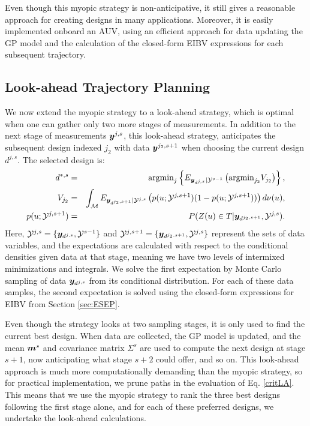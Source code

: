 \documentclass[aoas]{imsart}
\begin{document}
Even though this myopic strategy is non-anticipative, it still gives a
reasonable approach for creating designs in many
applications. Moreover, it is easily implemented onboard an AUV,
using an efficient approach for data updating the GP model and the
calculation of the closed-form EIBV expressions for each
subsequent trajectory.


\subsection{Look-ahead Trajectory Planning}
\label{sec:LA}

We now extend the myopic strategy to a look-ahead strategy, which is
optimal when one can gather only two more stages of measurements. In
addition to the next stage of measurements ${\boldsymbol y}^{j,s}$, this
look-ahead strategy, anticipates the subsequent design indexed $j_2$ with
data ${\boldsymbol y}^{j_2,s+1}$ when choosing the current design $d^{j,s}$.  The
selected design is:
\begin{eqnarray}\label{critLA}
    d^{*,s} &=& \mbox{argmin}_{j} \left\{ E_{\by_{d^{j,s}}|\mathcal{Y}^{s-1}} \left( \mbox{argmin}_{j_2}  V_{j_2} \right) \right\}, \\
V_{j_2} & = & \int_{\mathcal{M}} E_{\by_{d^{j_2,s+1}}|\mathcal{Y}^{j,s}} \left( p(\x;\mathcal{Y}^{j,s+1}) ( 1-p(\x;\mathcal{Y}^{j,s+1}) ) \right) d\mes(u), \nonumber \\
    p(\x;\mathcal{Y}^{j,s+1}) &=& P(Z(\x) \in T |\by_{d^{j_2,s+1}},\mathcal{Y}^{j,s}). \nonumber
\end{eqnarray}
Here, $\mathcal{Y}^{j,s}=\{{\boldsymbol y}_{d^{j,s}},\mathcal{Y}^{s-1}\}$ and
$\mathcal{Y}^{j,s+1}=\{{\boldsymbol y}_{d^{j_2,s+1}},\mathcal{Y}^{j,s}\}$ represent
the sets of data variables, and the expectations are calculated with respect to
the conditional densities given data at that stage, meaning we have two levels of intermixed minimizations and integrals.
We solve the
first expectation by Monte Carlo sampling of data ${\boldsymbol y}_{d^{j,s}}$ from its
conditional distribution. For each of these data samples, the second expectation
is solved using the closed-form expressions for EIBV from
Section \ref{sec:ESEP}.

Even though the strategy looks at two sampling stages, it is only used to find
the current best design. When data are collected, the GP model is
updated, and the mean ${\boldsymbol m}^{s}$ and covariance matrix $\Sigma^{s}$ are
used to compute the next design at stage $s+1$, now anticipating what
stage $s+2$ could offer, and so on.
This look-ahead approach is much more computationally demanding than
the myopic strategy, so for practical implementation, we prune paths
in the evaluation of Eq. \eqref{critLA}. This means that we use the myopic
strategy to rank the three best designs following the first stage alone, and
for each of these preferred designs, we undertake the look-ahead calculations.
\end{document}
